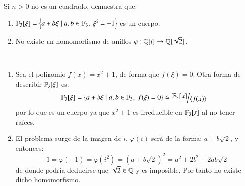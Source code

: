 \begin{ex}[H1.42 (parte)]
    Si $n > 0$ no es un cuadrado, demuestra que:
    \begin{enumerate}
        \item $\mathbb{F}_3[\xi] = \left\{a + b\xi \mid a, b \in \mathbb{F}_3,\ \xi^2 = -1\right\}$ es un cuerpo.
        \item No existe un homomorfismo de anillos $\varphi: \mathbb{Q}[i] \to \mathbb{Q}[\sqrt{2}]$.
    \end{enumerate}

    $ $\\\\
    \begin{enumerate}
        \item Sea el polinomio $f(x) = x^2 + 1$, de forma que $f(\xi) = 0$. Otra forma de describir $\mathbb{F}_3[\xi]$ es:
        $$
            \F_3[\xi] = \setdef{a + b\xi \mid a, b \in \F_3,\ f(\xi) = 0} \isom \quo{\F_3[x]}{\gen{f(x)}}
        $$
        por lo que es un cuerpo ya que $x^2+1$ es irreducible en $\mathbb{F}_3[x]$ al no tener raíces.
        \item El problema surge de la imagen de $i$. $\varphi(i)$ será de la forma: $a + b \sqrt{2}$, y entonces:
        $$
            -1 = \varphi(-1) = \varphi(i^2) = (a + b \sqrt{2})^2 = a^2 + 2b^2 + 2ab\sqrt{2}
        $$
        de donde podría deducirse que $\sqrt{2} \in \mathbb{Q}$ y es imposible. Por tanto no existe dicho homomorfismo.
    \end{enumerate}
\end{ex}
